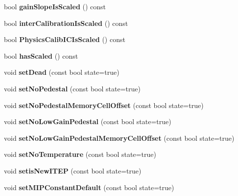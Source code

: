 \begin{DoxyCompactItemize}
\item 
bool {\bfseries gain\-Slope\-Is\-Scaled} () const \label{classCALICE_1_1Ahc2CalibrationStatusBits_a0f661aabae4ebbc614e5cd64f5494997}

\item 
bool {\bfseries inter\-Calibration\-Is\-Scaled} () const \label{classCALICE_1_1Ahc2CalibrationStatusBits_a05d6c638e0e7f499f8b767deba52b7ef}

\item 
bool {\bfseries Physics\-Calib\-I\-C\-Is\-Scaled} () const \label{classCALICE_1_1Ahc2CalibrationStatusBits_a9cd5210e7e5a264e30965e2014d9eedc}

\item 
bool {\bfseries has\-Scaled} () const \label{classCALICE_1_1Ahc2CalibrationStatusBits_a7722b3dc5a233bcb4390f62f809dd56c}

\item 
void {\bfseries set\-Dead} (const bool state=true)\label{classCALICE_1_1Ahc2CalibrationStatusBits_a7086d3e5eb96292e47cd896457986780}

\item 
void {\bfseries set\-No\-Pedestal} (const bool state=true)\label{classCALICE_1_1Ahc2CalibrationStatusBits_a759b14ec17dfa8266058ee01400fec4e}

\item 
void {\bfseries set\-No\-Pedestal\-Memory\-Cell\-Offset} (const bool state=true)\label{classCALICE_1_1Ahc2CalibrationStatusBits_afeba8093ee394e62aa5efa35231844ef}

\item 
void {\bfseries set\-No\-Low\-Gain\-Pedestal} (const bool state=true)\label{classCALICE_1_1Ahc2CalibrationStatusBits_a70af0a84f3fc458957895508bbf235cf}

\item 
void {\bfseries set\-No\-Low\-Gain\-Pedestal\-Memory\-Cell\-Offset} (const bool state=true)\label{classCALICE_1_1Ahc2CalibrationStatusBits_a01fd34e07c5af526282d4b4fe47d4d78}

\item 
void {\bfseries set\-No\-Temperature} (const bool state=true)\label{classCALICE_1_1Ahc2CalibrationStatusBits_aa3c37fe71a8a3727699dda63f145d08e}

\item 
void {\bfseries setis\-New\-I\-T\-E\-P} (const bool state=true)\label{classCALICE_1_1Ahc2CalibrationStatusBits_a618d44185909927e61bf308b71ab3f02}

\item 
void {\bfseries set\-M\-I\-P\-Constant\-Default} (const bool state=true)\label{classCALICE_1_1Ahc2CalibrationStatusBits_a563abd517939b634e2d4a032476c5f50}


\end{DoxyCompactItemize}
